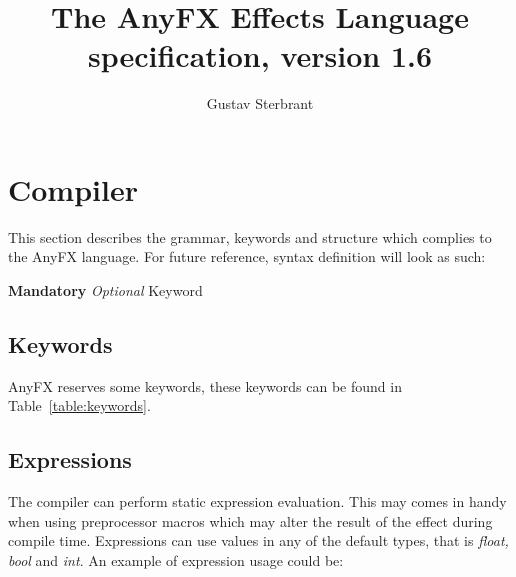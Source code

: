 \documentclass{article}
\newcommand{\SyntaxBox}[1]
{	
	\begin{center}
	\colorbox{orange!60}
	{
		\begin{minipage}{\linewidth}
		\hfill
		\begin{tabbing}
		#1
		\end{tabbing}
		\end{minipage}
	}
	\end{center}
}
\begin{document}
\title{The AnyFX Effects Language specification, version 1.6}
\author{Gustav Sterbrant}
\date{}
\maketitle

\clearpage
\tableofcontents
\clearpage

\section{Compiler}
This section describes the grammar, keywords and structure which complies to the AnyFX language. For future reference, syntax definition will look as such:

\SyntaxBox
{
	\textbf{Mandatory} \textit{Optional} Keyword
}

\subsection{Keywords}
AnyFX reserves some keywords, these keywords can be found in Table~\ref{table:keywords}.

\begin{table}[hp]
\centering
\caption{Keywords}
\label{table:keywords}
\end{table}

\subsection{Expressions}
The compiler can perform static expression evaluation. This may comes in handy when using preprocessor macros which may alter the result of the effect during compile time. Expressions can use values in any of the default types, that is \textit{float, bool} and \textit{int}. An example of expression usage could be:
\end{document}
